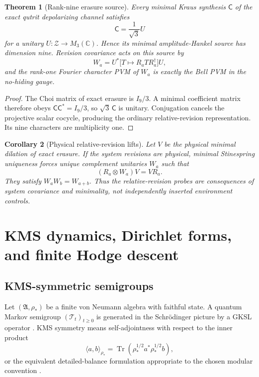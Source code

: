 \documentclass[11pt,oneside,openany]{book}
\numberwithin{equation}{chapter}
\newtheorem{theorem}{Theorem}[chapter]
\newtheorem{corollary}[theorem]{Corollary}
\theoremstyle{definition}
\theoremstyle{remark}
\newcommand{\C}{\mathbb C}
\newcommand{\Tr}{\operatorname{Tr}}
\newcommand{\ip}[2]{\langle #1,#2\rangle}
\begin{document}
\begin{theorem}[Rank-nine erasure source]
\label{thm:v5-rank-nine-erasure}
Every minimal Kraus synthesis \(\mathsf C\) of the exact qutrit depolarizing
channel satisfies
\[
 \boxed{\mathsf C=\frac1{\sqrt3}U}
\]
for a unitary \(U:\mathcal Z\to M_3(\C)\).  Hence its minimal amplitude-Hankel
source has dimension nine.  Revision covariance acts on this source by
\[
 W_a=U^*\bigl[T\mapsto R_aTR_a^\dagger\bigr]U,
\]
and the rank-one Fourier character PVM of \(W_a\) is exactly the Bell PVM in
the no-hiding gauge.
\end{theorem}

\begin{proof}
The Choi matrix of exact erasure is \(I_9/3\).  A minimal coefficient matrix
therefore obeys \(\mathsf C\mathsf C^*=I_9/3\), so
\(\sqrt3\,\mathsf C\) is unitary.  Conjugation cancels the projective scalar
cocycle, producing the ordinary relative-revision representation.  Its nine
characters are multiplicity one.
\end{proof}

\begin{corollary}[Physical relative-revision lifts]
\label{cor:v5-physical-relative-lifts}
Let \(V\) be the physical minimal dilation of exact erasure.  If the system
revisions are physical, minimal Stinespring uniqueness forces unique
complement unitaries \(W_a\) such that
\[
 \boxed{(R_a\otimes W_a)V=VR_a.}
\]
They satisfy \(W_aW_b=W_{a+b}\).  Thus the relative-revision probes are
consequences of system covariance and minimality, not independently inserted
environment controls.
\end{corollary}


\chapter{KMS dynamics, Dirichlet forms, and finite Hodge descent}
\label{ch:hodge}

\section{KMS-symmetric semigroups}
Let $(\mathfrak A,\rho_*)$ be a finite von Neumann algebra with faithful state.  A quantum Markov semigroup $(\mathcal T_t)_{t\ge0}$ is generated in the Schr\"odinger picture by a GKSL operator \cite{Lindblad1976,GoriniKossakowskiSudarshan1976}.  KMS symmetry means self-adjointness with respect to the inner product
\[
 \ip{a}{b}_{\rho_*}
 =\Tr\!\left(\rho_*^{1/2}a^*\rho_*^{1/2}b\right),
\]
or the equivalent detailed-balance formulation appropriate to the chosen modular convention \cite{KossakowskiFrigerioGoriniVerri1977,GoldsteinLindsay1995}.
\end{document}
